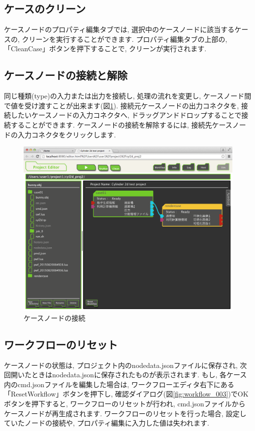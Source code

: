 \documentclass[a4paper,10pt,oneside]{jsbook}
\begin{document}
\subsection{ケースのクリーン}
ケースノードのプロパティ編集タブでは, 選択中のケースノードに該当するケースの, クリーンを実行することができます.
プロパティ編集タブの上部の, 「CleanCase」ボタンを押下することで, クリーンが実行されます.

\subsection{ケースノードの接続と解除}
同じ種類(type)の入力または出力を接続し, 処理の流れを変更し, ケースノード間で値を受け渡すことが出来ます(図\ref{fig:workflow_002}).
接続元ケースノードの出力コネクタを, 接続したいケースノードの入力コネクタへ, ドラッグアンドドロップすることで接続することができます.
ケースノードの接続を解除するには, 接続先ケースノードの入力コネクタをクリックします.

\begin{figure}[H]
	\begin{center}
		\includegraphics[width=12.0cm]{image/workflow_002.png}
	\end{center}
	\caption{ケースノードの接続}
	\label{fig:workflow_002}
\end{figure}

\subsection{ワークフローのリセット}
ケースノードの状態は, プロジェクト内のnodedata.jsonファイルに保存され, 次回開いたときはnodedata.jsonに保存されたものが表示されます.
もし, 各ケース内のcmd.jsonファイルを編集した場合は, ワークフローエディタ右下にある「ResetWorkflow」ボタンを押下し,
確認ダイアログ(図\ref{fig:workflow_003})でOKボタンを押下すると, ワークフローのリセットが行われ, cmd.jsonファイルからケースノードが再生成されます.
ワークフローのリセットを行った場合, 設定していたノードの接続や, プロパティ編集に入力した値は失われます.
\end{document}
